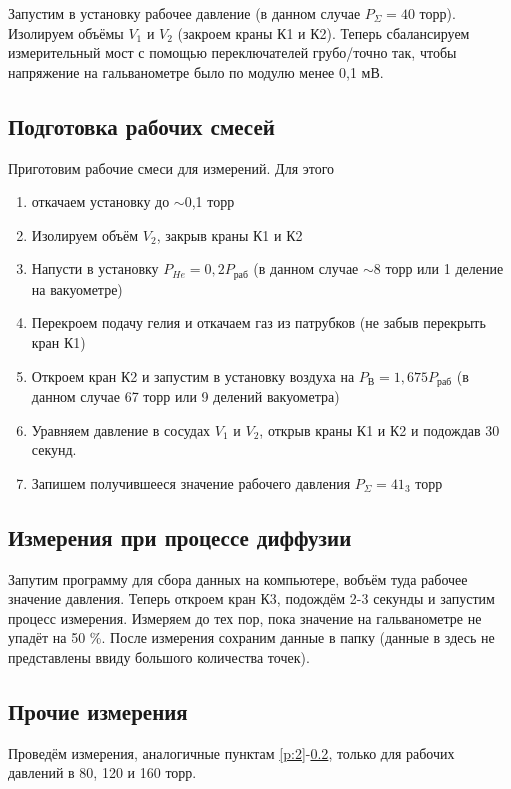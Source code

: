 \documentclass[a4paper,12pt]{article}
\begin{document}
Запустим в установку рабочее давление (в данном случае $P_\Sigma = 40$ торр). Изолируем объёмы $V_1$ и $V_2$ (закроем краны К1 и К2). Теперь сбалансируем измерительный мост с помощью переключателей грубо/точно так, чтобы напряжение на гальванометре было по модулю менее 0,1 мВ.

\subsection{Подготовка рабочих смесей}

Приготовим рабочие смеси для измерений. Для этого

\begin{enumerate}
    \item откачаем установку до $\sim$0,1 торр
    \item Изолируем объём $V_2$, закрыв краны К1 и К2
    \item Напусти в установку $P_{He} = 0,2 P_\text{раб}$ (в данном случае $\sim$8 торр или 1 деление на вакуометре)
    \item Перекроем подачу гелия и откачаем газ из патрубков (не забыв перекрыть кран К1)
    \item Откроем кран К2 и запустим в установку воздуха на $P_\text{В} = 1,675 P_\text{раб}$ (в данном случае 67 торр или 9 делений вакуометра)
    \item Уравняем давление в сосудах $V_1$ и $V_2$, открыв краны К1 и К2 и подождав 30 секунд.
    \item Запишем получившееся значение рабочего давления $P_\Sigma = 41_3$ торр
\end{enumerate}

\subsection{Измерения при процессе диффузии}
\label{p:5}

Запутим программу для сбора данных на компьютере, вобъём туда рабочее значение давления. Теперь откроем кран К3, подождём 2-3 секунды и запустим процесс измерения. Измеряем до тех пор, пока значение на гальванометре не упадёт на 50 \%. После измерения сохраним данные в папку (данные в здесь не представлены ввиду большого количества точек).

\subsection{Прочие измерения}

Проведём измерения, аналогичные пунктам \ref{p:2}-\ref{p:5}, только для рабочих давлений в 80, 120 и 160 торр.
\end{document}
